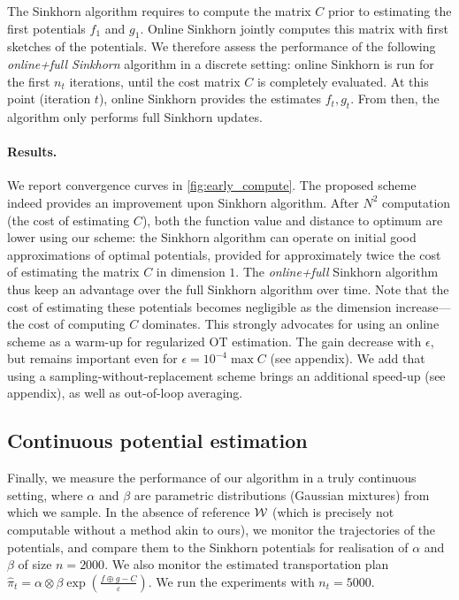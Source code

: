 The Sinkhorn algorithm requires to compute the matrix $C$ prior to estimating
the first potentials $f_1$ and $g_1$. Online Sinkhorn jointly computes this
matrix with first sketches of the potentials. We therefore assess the
performance of the following \textit{online+full Sinkhorn} algorithm in a
discrete setting: online Sinkhorn is run for the first $n_t$ iterations, until
the cost matrix $C$ is completely evaluated. At this point (iteration $t$),
online Sinkhorn provides the estimates $f_{t}, g_{t}$. From then, the algorithm
only performs full Sinkhorn updates.

\paragraph{Results.} We report convergence curves in
\autoref{fig:early_compute}. The proposed scheme indeed provides an improvement
upon Sinkhorn algorithm. After $N^2$ computation (the cost of estimating $C$),
both the function value and distance to optimum are lower using our scheme: the
Sinkhorn algorithm can operate on initial good approximations of optimal
potentials, provided for approximately twice the cost of estimating the matrix
$C$ in dimension $1$. The \textit{online+full} Sinkhorn algorithm thus keep an
advantage over the full Sinkhorn algorithm over time. Note that the cost of
estimating these potentials becomes negligible as the dimension increase---the
cost of computing $C$ dominates. This strongly advocates for using an online
scheme as a warm-up for regularized OT estimation. The gain decrease with
$\epsilon$, but remains important even for $\epsilon = 10^{-4} \max C$ (see
appendix). We add that using a
sampling-without-replacement scheme brings an additional speed-up (see appendix), as well as out-of-loop averaging.

\subsection{Continuous potential estimation}

Finally, we measure the performance of our algorithm in a truly continuous
setting, where $\alpha$ and $\beta$ are parametric distributions (Gaussian
mixtures) from which we sample. In the absence of reference $\mathcal{W}$ (which is
precisely not computable without a method akin to ours), we monitor the
trajectories of the potentials, and compare them to the Sinkhorn potentials for
realisation of $\alpha$ and $\beta$ of size $n=2000$. We also monitor the
estimated transportation plan $\hat \pi_t = \alpha \otimes \beta
\exp(\frac{f\oplus g - C}{\varepsilon})$. We run the experiments with
$n_t=5000$.

